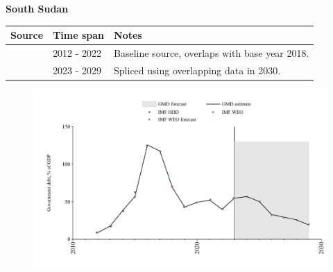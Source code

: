 \documentclass[12pt,a4paper,landscape]{article}
\begin{document}
\begin{adjustbox}{max totalsize={\paperwidth}{\paperheight},center}
\begin{minipage}[t][\textheight][t]{\textwidth}
\vspace*{0.5cm}
{}
\begin{center}
{\Large\bfseries South Sudan}
\end{center}
\vspace{0.5cm}
\begin{table}[H]
\centering
\small
\begin{tabular}{|l|l|l|}
\hline
\textbf{Source} & \textbf{Time span} & \textbf{Notes} \\
\hline
\rowcolor{white}\cite{IMF_WEO}& 2012 - 2022 &Baseline source, overlaps with base year 2018.\\
\rowcolor{lightgray}\cite{IMF_WEO_forecast}& 2023 - 2029 &Spliced using overlapping data in 2030.\\
\hline
\end{tabular}
\end{table}
\begin{figure}[H]
\centering
\includegraphics[width=\textwidth,height=0.6\textheight,keepaspectratio]{graphs/SSD_govdebt_GDP.pdf}
\end{figure}
\end{minipage}
\end{adjustbox}
\end{document}

